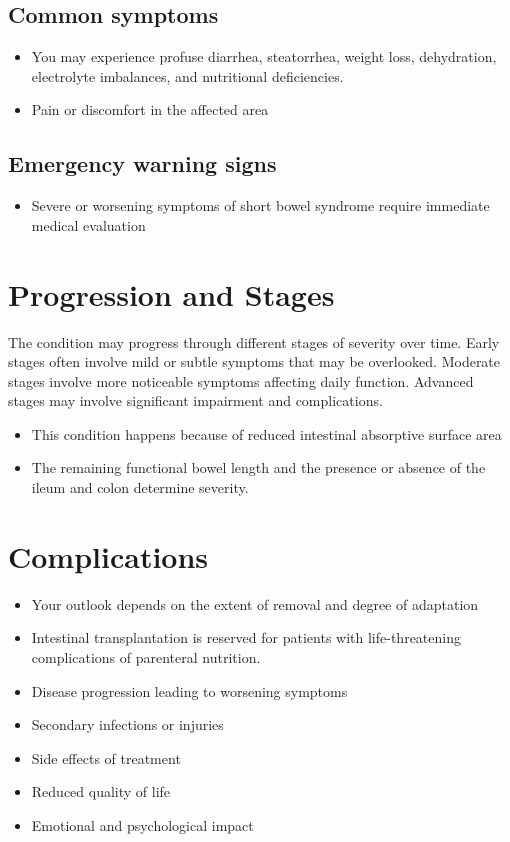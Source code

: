 \subsection{Common symptoms}
\begin{itemize}[noitemsep]
  \item You may experience profuse diarrhea, steatorrhea, weight loss, dehydration, electrolyte imbalances, and nutritional deficiencies.

  \item Pain or discomfort in the affected area
  \end{itemize}

\subsection{Emergency warning signs}
\begin{itemize}[noitemsep]
  \item Severe or worsening symptoms of short bowel syndrome require immediate medical evaluation
\end{itemize}
\section{Progression and Stages}
The condition may progress through different stages of severity over time. Early stages often involve mild or subtle symptoms that may be overlooked. Moderate stages involve more noticeable symptoms affecting daily function. Advanced stages may involve significant impairment and complications.

\begin{itemize}[noitemsep]
  \item This condition happens because of reduced intestinal absorptive surface area
  \item The remaining functional bowel length and the presence or absence of the ileum and colon determine severity.
\end{itemize}
\section{Complications}
\begin{itemize}[noitemsep]
  \item Your outlook depends on the extent of removal and degree of adaptation
  \item Intestinal transplantation is reserved for patients with life-threatening complications of parenteral nutrition.
  \item Disease progression leading to worsening symptoms
  \item Secondary infections or injuries
  \item Side effects of treatment
  \item Reduced quality of life
  \item Emotional and psychological impact
\end{itemize}
